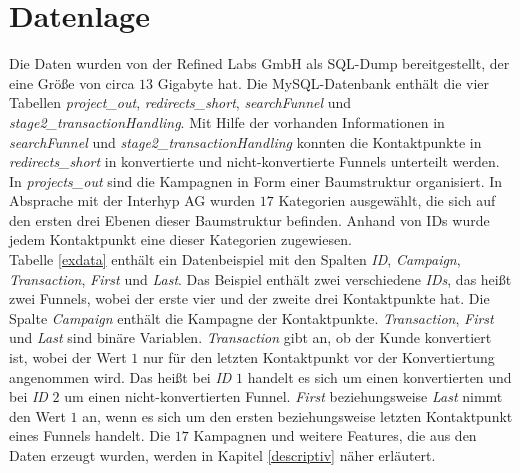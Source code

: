 \section{Datenlage}\label{datenlage}
Die Daten wurden von der Refined Labs GmbH als SQL-Dump bereitgestellt, der eine Größe von circa $13$ Gigabyte hat. Die MySQL-Datenbank enthält die vier Tabellen \textit{project\_out}, \textit{redirects\_short}, \textit{searchFunnel} und \textit{stage2\_transactionHandling}. Mit Hilfe der vorhanden Informationen in \textit{searchFunnel} und \textit{stage2\_transactionHandling} konnten die Kontaktpunkte in \textit{redirects\_short} in konvertierte und nicht-konvertierte Funnels unterteilt werden. In \textit{projects\_out} sind die Kampagnen in Form einer Baumstruktur organisiert. In Absprache mit der Interhyp AG wurden $17$ Kategorien ausgewählt, die sich auf den ersten drei Ebenen dieser Baumstruktur befinden. Anhand von IDs wurde jedem Kontaktpunkt eine dieser Kategorien zugewiesen.\\
Tabelle \ref{exdata} enthält ein Datenbeispiel mit den Spalten \textit{ID}, \textit{Campaign}, \textit{Transaction}, \textit{First} und \textit{Last}. Das Beispiel enthält zwei verschiedene \textit{IDs}, das heißt zwei Funnels, wobei der erste vier und der zweite drei Kontaktpunkte hat. Die Spalte \textit{Campaign} enthält die Kampagne der Kontaktpunkte. \textit{Transaction}, \textit{First} und \textit{Last} sind binäre Variablen. \textit{Transaction} gibt an, ob der Kunde konvertiert ist, wobei der Wert $1$ nur für den letzten Kontaktpunkt vor der Konvertiertung angenommen wird. Das heißt bei \textit{ID} $1$ handelt es sich um einen konvertierten und bei \textit{ID} $2$ um einen nicht-konvertierten Funnel. \textit{First} beziehungsweise \textit{Last} nimmt den Wert $1$ an, wenn es sich um den ersten beziehungsweise letzten Kontaktpunkt eines Funnels handelt. Die $17$ Kampagnen und weitere Features, die aus den Daten erzeugt wurden, werden in Kapitel \ref{descriptiv} näher erläutert.\\
